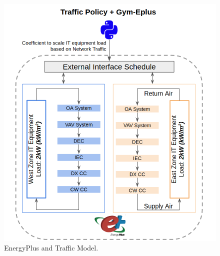 \begin{figure} [!h]
\centering
\includegraphics[scale=.25]{building_energy_model/img/python_eplus.png}
\caption[EnergyPlus and Traffic Model.]{EnergyPlus and Traffic Model.}
\label{img_ep_py}
\end{figure}